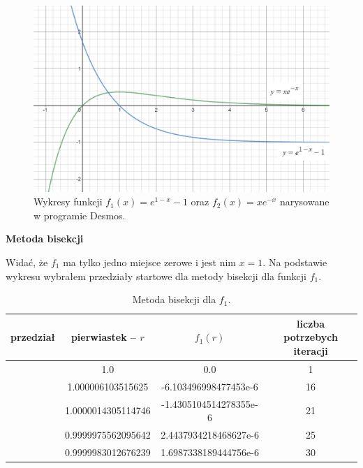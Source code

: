 \documentclass[]{article}
\begin{document}
	\begin{figure}[!htbp]
		\includegraphics[width=\textwidth]{e1-x-1andxe-x.png}
		\centering
		\caption{Wykresy funkcji $f_1(x)=e^{1-x}-1$ oraz $f_2(x)=xe^{-x}$ narysowane w programie Desmos.}
	\end{figure}
	\noindent\textbf{Metoda bisekcji}

	\noindent Widać, że $f_1$ ma tylko jedno miejsce zerowe i jest nim $x=1$. Na podstawie wykresu wybrałem przedziały startowe dla metody bisekcji dla funkcji $f_1$.
	
	\begin{table}[!h]
		\centering
		\label{tab:table1}
		\begin{tabular}{|c|c|c|c|}
			\hline
			przedział & pierwiastek -- $r$ & $f_1(r)$ & liczba potrzebych iteracji\\
			\hline
			[0.0, 2.0] & 1.0 & 0.0 & 1 \\ \hline
			[0.4, 2.4] & 1.000006103515625 & -6.103496998477453e-6 & 16 \\ \hline
			[-10.0, 25.0] & 1.0000014305114746 & -1.4305104514278355e-6 & 21 \\ \hline
			[-450.0, 500.0] & 0.9999975562095642 & 2.4437934218468627e-6 & 25 \\ \hline
			[-10000.0, 10000.0] & 0.9999983012676239 & 1.6987338189444756e-6 & 30 \\ \hline
		\end{tabular}
	\caption*{Metoda bisekcji dla $f_1$.}
	\end{table}
\end{document}

